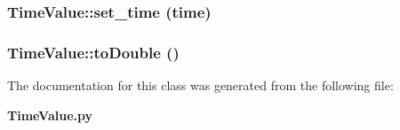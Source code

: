 \subsubsection{\setlength{\rightskip}{0pt plus 5cm}Time\-Value::set\_\-time (time)}\label{classTimeValue_TimeValuea2}


\subsubsection{\setlength{\rightskip}{0pt plus 5cm}Time\-Value::to\-Double ()}\label{classTimeValue_TimeValuea3}




The documentation for this class was generated from the following file:\begin{CompactItemize}
\item 
{\bf Time\-Value.py}\end{CompactItemize}
